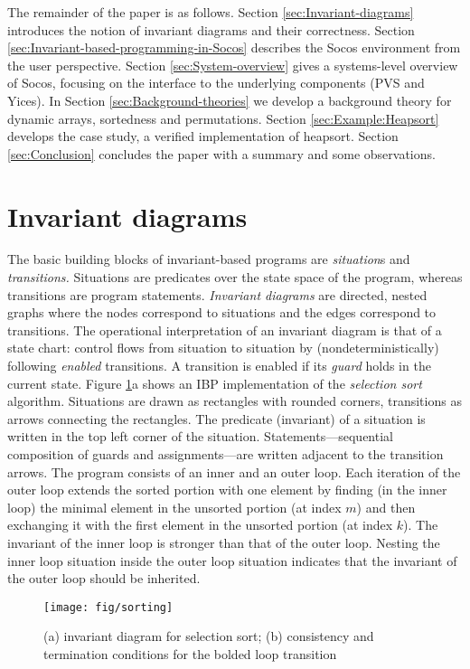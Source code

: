 \documentclass[english,submission]{eptcs}
\begin{document}
The remainder of the paper is as follows. Section \ref{sec:Invariant-diagrams}
introduces the notion of invariant diagrams and their correctness.
Section \ref{sec:Invariant-based-programming-in-Socos} describes
the Socos environment from the user perspective. Section \ref{sec:System-overview}
gives a systems-level overview of Socos, focusing on the interface
to the underlying components (PVS and Yices). In Section \ref{sec:Background-theories}
we develop a background theory for dynamic arrays, sortedness and
permutations. Section \ref{sec:Example:Heapsort} develops the case
study, a verified implementation of heapsort. Section \ref{sec:Conclusion}
concludes the paper with a summary and some observations.


\section{Invariant diagrams\label{sec:Invariant-diagrams}}

The basic building blocks of invariant-based programs are
\emph{situation}s and \emph{transitions.} Situations are predicates
over the state space of the program, whereas transitions are program
statements.  \emph{Invariant diagrams} are directed, nested graphs
where the nodes correspond to situations and the edges correspond to
transitions. The operational interpretation of an invariant diagram is
that of a state chart: control flows from situation to situation by
(nondeterministically) following \emph{enabled }transitions. A
transition is enabled if its \emph{guard }holds in the current state.
Figure \ref{fig:Sorting}a shows an IBP implementation of the
\emph{selection sort} algorithm. Situations are drawn as rectangles
with rounded corners, transitions as arrows connecting the rectangles.
The predicate (invariant) of a situation is written in the top left
corner of the situation. Statements---sequential composition of guards
and assignments---are written adjacent to the transition arrows. The
program consists of an inner and an outer loop. Each iteration of the
outer loop extends the sorted portion with one element by finding (in
the inner loop) the minimal element in the unsorted portion (at index
$m$) and then exchanging it with the first element in the unsorted
portion (at index $k$). The invariant of the inner loop is stronger
than that of the outer loop. Nesting the inner loop situation inside
the outer loop situation indicates that the invariant of the outer
loop should be inherited.
\begin{figure}
\noindent \begin{centering}
\texttt{[image: fig/sorting]}
\par\end{centering}

\caption{(a) invariant diagram for selection sort; (b) consistency and termination
conditions for the bolded loop transition\label{fig:Sorting}}
\end{figure}
\end{document}

